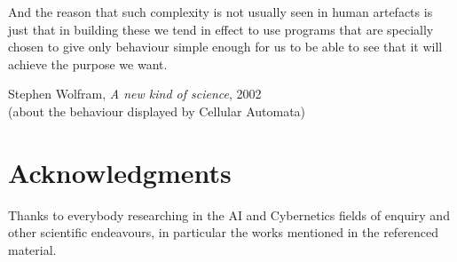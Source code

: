 \documentclass[14pt,a4paper]{extarticle}
\begin{document}
\epigraph{
And the reason that such complexity is not usually seen in human artefacts is just that in building these we tend in effect to use programs that are specially chosen to give only behaviour simple enough for us to be able to see that it will achieve the purpose we want.}{Stephen Wolfram, \textit{A new kind of science}, 2002
\\(about the behaviour displayed by Cellular Automata)}



\section*{Acknowledgments}%
\label{sec:acknowledg}%
Thanks to everybody researching in the AI and Cybernetics fields of enquiry and other scientific endeavours, in particular the works mentioned in the referenced material.
\end{document}

